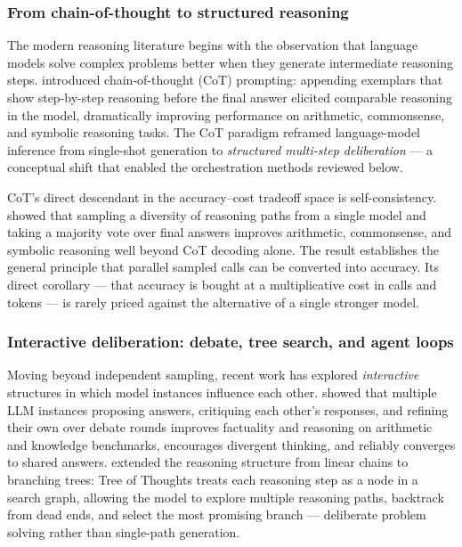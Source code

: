 \documentclass[12pt,a4paper]{article}
\begin{document}
\subsubsection{From chain-of-thought to structured reasoning}

The modern reasoning literature begins with the observation that language models
solve complex problems better when they generate intermediate reasoning steps.
\citet{WeiEtAl2022} introduced chain-of-thought (CoT) prompting: appending
exemplars that show step-by-step reasoning before the final answer elicited
comparable reasoning in the model, dramatically improving performance on
arithmetic, commonsense, and symbolic reasoning tasks. The CoT paradigm
reframed language-model inference from single-shot generation to
\emph{structured multi-step deliberation} --- a conceptual shift that enabled
the orchestration methods reviewed below.

CoT's direct descendant in the accuracy--cost tradeoff space is
self-consistency. \citet{WangEtAl2023} showed that sampling a diversity of
reasoning paths from a single model and taking a majority vote over final
answers improves arithmetic, commonsense, and symbolic reasoning well beyond
CoT decoding alone. The result establishes the general principle that parallel
sampled calls can be converted into accuracy. Its direct corollary --- that
accuracy is bought at a multiplicative cost in calls and tokens --- is rarely
priced against the alternative of a single stronger model.

\subsubsection{Interactive deliberation: debate, tree search, and agent loops}

Moving beyond independent sampling, recent work has explored \emph{interactive}
structures in which model instances influence each other. \citet{LiangEtAl2024}
showed that multiple LLM instances proposing answers, critiquing each other's
responses, and refining their own over debate rounds improves factuality and
reasoning on arithmetic and knowledge benchmarks, encourages divergent
thinking, and reliably converges to shared answers. \citet{YaoEtAl2023} extended
the reasoning structure from linear chains to branching trees: Tree of Thoughts
treats each reasoning step as a node in a search graph, allowing the model to
explore multiple reasoning paths, backtrack from dead ends, and select the most
promising branch --- deliberate problem solving rather than single-path
generation.
\end{document}
